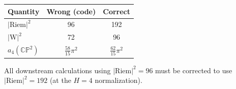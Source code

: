 \documentclass[11pt]{article}
\newcommand{\Riem}{\mathrm{Riem}}
\newcommand{\Weyl}{\mathrm{W}}
\begin{document}
\begin{center}
\begin{tabular}{l|c|c}
\hline
\textbf{Quantity} & \textbf{Wrong (code)} & \textbf{Correct} \\
\hline
$|\Riem|^2$ & 96 & 192 \\
$|\Weyl|^2$ & 72 & 96 \\
$a_4(\mathbb{CP}^2)$ & $\frac{58}{15}\pi^2$ & $\frac{62}{15}\pi^2$ \\
\hline
\end{tabular}
\end{center}

All downstream calculations using $|\Riem|^2 = 96$ must be corrected to use
$|\Riem|^2 = 192$ (at the $H=4$ normalization).
\end{document}
